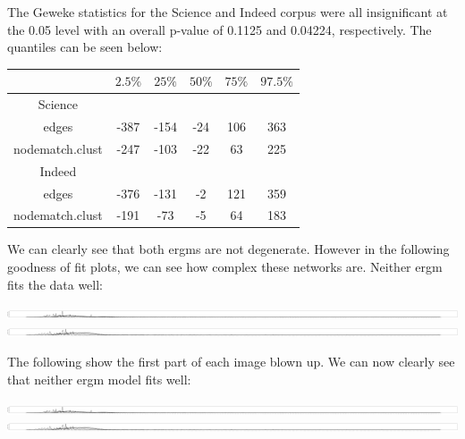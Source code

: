 \documentclass[12pt]{article}
\begin{document}
\vspace{2mm}
\noindent The Geweke statistics for the Science and Indeed corpus were all insignificant at the 0.05 level with an overall p-value of 0.1125 and 0.04224, respectively. The quantiles can be seen below:
 \vspace{2mm}
 \begin{center}
 	\begin{tabular}{ |c||c|c|c|c|c|  }
 		\hline
 		&$2.5\%$     &$25\%$     &$50\%$    &$75\%$  &$97.5\%$ \\
 		\hline
 		Science&&&&& \\
 		\hline
 		edges&           -387&  -154&  -24&  106&  363 \\
 		nodematch.clust&  -247&  -103&  -22&  63&225 \\
 		\hline
 		Indeed&&&&& \\
 		\hline
 		edges&           -376&  -131&  -2&  121&  359 \\
 		nodematch.clust&  -191&  -73&  -5&  64&183 \\
 		\hline
 	\end{tabular}
 \end{center}
 \vspace{2mm}
We can clearly see that both ergms are not degenerate. However in the following goodness of fit plots, we can see how complex these networks are. Neither ergm fits the data well:
\vspace{2mm}
\begin{center} 
	\includegraphics[scale=0.05]{Images/Sci_fit2.pdf} 
	\includegraphics[scale=0.05]{Images/Indeed_fit2.pdf} 
\end{center} 
\vspace{2mm}
The following show the first part of each image blown up. We can now clearly see that neither ergm model fits well:
\vspace{2mm}
\begin{center} 
	\includegraphics[scale=0.5]{Images/Sci_fit2.pdf} 
	\includegraphics[scale=0.5]{Images/Indeed_fit2.pdf} 
\end{center} 
\vspace{2mm}
\end{document}
